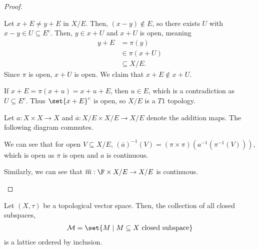 \documentclass[10pt]{mypackage}
\begin{document}
\begin{proof}
\begin{enumerate}[(1)]
      Let $x+E\neq y+E$ in $X/E$. Then, $\left(x-y\right)\notin E$, so there exists $U$ with $x-y\in U\subseteq E^{c}$. Then, $y\in x+U$ and $x+U$ is open, meaning
      \begin{align*}
        y+E &= \pi(y)\\
            &\in \pi\left(x+U\right)\\
            &\subseteq X/E.
      \end{align*}
      Since $\pi$ is open, $x+U$ is open. We claim that $x+E\notin x+U$.\newline

      If $x+E = \pi\left(x+u\right) = x+u+E$, then $u\in E$, which is a contradiction as $U\subseteq E^{c}$. Thus $\set{x+E}^{c}$ is open, so $X/E$ is a $T1$ topology.\newline

      Let $a : X\times X\rightarrow X$ and $\overline{a}: X/E\times X/E\rightarrow X/E$ denote the addition maps. The following diagram commutes.
      \begin{center}
      \end{center}
      We can see that for open $V\subseteq X/E$, $\left(\overline{a}\right)^{-1}\left(V\right) = \left(\pi\times\pi\right)\left(a^{-1}\left(\pi^{-1}\left(V\right)\right)\right)$, which is open as $\pi$ is open and $a$ is continuous.\newline

      Similarly, we can see that $\overline{m}:\F\times X/E\rightarrow X/E$ is continuous.
  \end{enumerate}
\end{proof}
\begin{proposition}
  Let $\left(X,\tau\right)$ be a topological vector space. Then, the collection of all closed subspaces, 
  \begin{align*}
    \mathcal{M} = \set{M\mid M\subseteq X\text{ closed subspace}}
  \end{align*}
  is a lattice ordered by inclusion.
\end{proposition}
\end{document}
